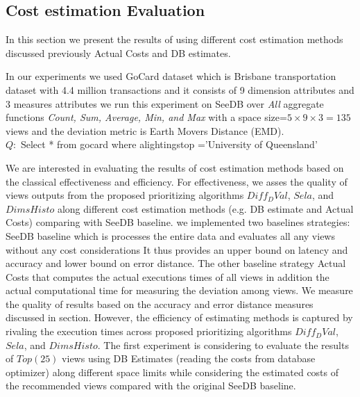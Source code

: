 \subsection{Cost estimation Evaluation} \label{CostsExper}
In this section we present the results of using different cost estimation methods discussed
previously Actual Costs and DB estimates.

In our experiments we used GoCard dataset which is Brisbane transportation dataset 
with 4.4 million transactions and it consists of 9 dimension attributes and 3 measures attributes
we run this experiment on SeeDB 
over \emph{All} aggregate functions \emph{Count, Sum, Average, Min, and Max} with 
a space size=$5 \times 9 \times 3=135$ views and 
the deviation metric is Earth Movers Distance (EMD).\\

\footnotesize {$Q:$ Select * from gocard where alightingstop ='University of Queensland'} 

\normalsize  
We are interested in evaluating 
the results of cost estimation methods based on the classical effectiveness and 
efficiency. For effectiveness, we asses the quality of views outputs from the proposed prioritizing 
algorithms $Diff_DVal$, $Sela$, and $DimsHisto$ along different cost estimation methods 
(e.g. DB estimate and Actual Costs) comparing with SeeDB baseline. 
we implemented two baselines strategies: SeeDB baseline which is processes the entire data and evaluates all any views without any cost considerations It thus provides an upper bound on latency and accuracy and lower bound on error distance. The other baseline strategy Actual Costs that computes the actual executions times of all views in addition the actual computational time for measuring the deviation among views.
We measure the quality of results based on the accuracy and error distance measures discussed 
in section. However, the efficiency of estimating methods is captured by rivaling the execution times across proposed prioritizing algorithms  $Diff_DVal$, $Sela$, and $DimsHisto$.
The first experiment is considering to evaluate the results of $Top(25)$ views 
using DB Estimates (reading the costs from database optimizer)
along different space limits while considering the estimated costs of the recommended views compared with the original SeeDB baseline.

